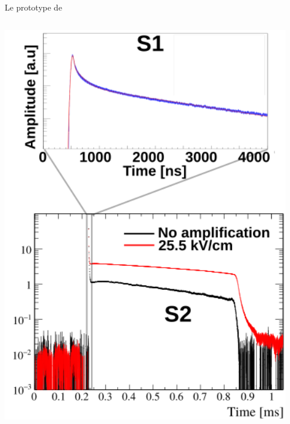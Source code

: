 \begin{frame}{Le prototype de \TOO{}}
\begin{scriptsize}
\begin{columns}
\begin{column}{0.5\textwidth}
                   	\flushright\includegraphics[width=0.95\textwidth]{./pictures/scintillation.png}
               	\end{column}
           	\end{columns}
       	\end{scriptsize}
   	\end{frame}
	    

